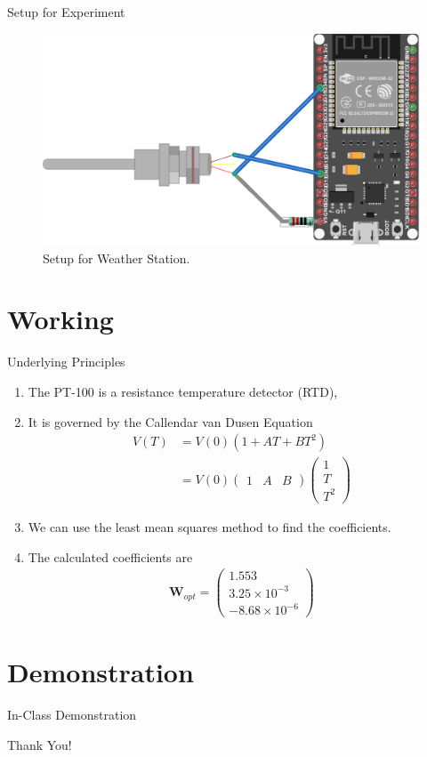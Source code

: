 \documentclass{beamer}
\providecommand{\brak}[1]{\ensuremath{\left(#1\right)}}
\theoremstyle{remark}
\newcommand{\myvec}[1]{\ensuremath{\begin{pmatrix}#1\end{pmatrix}}}
\renewcommand{\vec}[1]{\mathbf{\boldsymbol{#1}}}
\begin{document}
\begin{frame}{Setup for Experiment}
    \begin{figure}[!ht]
        \centering
        \includegraphics[width=0.6\columnwidth]{figs/esp32.png}
        \caption{Setup for Weather Station.}
        \label{fig:setup}
    \end{figure}
\end{frame}

\section{Working}
\begin{frame}{Underlying Principles}
    \begin{enumerate}
        \item The PT-100 is a resistance temperature detector (RTD),
        \pause
        \item It is governed by the Callendar van Dusen Equation
        \begin{align}
            V(T) &= V(0)\brak{1 + AT + BT^2} \\
                 &= V(0)\myvec{1&A&B}\myvec{1\\T\\T^2}
        \end{align}
        \pause
        \item We can use the least mean squares method to find the coefficients.
        \item The calculated coefficients are
        \begin{align}
            \vec{W}_{opt} = \myvec{1.553\\3.25 \times 10^{-3} \\ -8.68 \times 10^{-6}}
        \end{align}
    \end{enumerate}
\end{frame}

\section{Demonstration}
\begin{frame}
    \begin{center}
        \Huge In-Class Demonstration
    \end{center}
\end{frame}

\begin{frame}
    \begin{center}
        \Huge Thank You!
    \end{center}
\end{frame}
\end{document}
